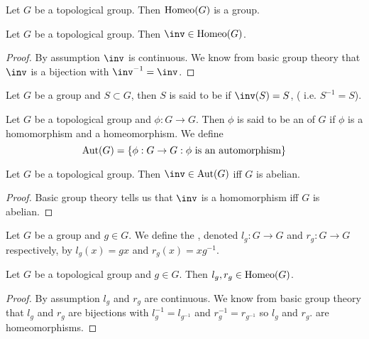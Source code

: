 \documentclass{book}
\begin{document}
	\begin{note}
	Let $G$ be a topological group. Then $\operatorname{Homeo}(G)$ is a group.
	\end{note}
	
	\begin{ex}  
		Let $G$ be a topological group. Then $\inv \in \Homeo(G)$.
	\end{ex}

	\begin{proof}
		By assumption $\inv$ is continuous. We know from basic group theory that $\inv$ is a bijection with $\inv^{-1} = \inv$. 
	\end{proof}

	\begin{defn}  
		Let $G$ be a group and $S \subset G$, then $S$ is said to be  if $\inv(S) = S$, ( i.e. $S^{-1} = S$).
	\end{defn}
	
	\begin{defn}  
		Let $G$ be a topological group and $\phi:G \rightarrow G$. Then $\phi$ is said to be an  of $G$ if $\phi$ is a homomorphism and a homeomorphism. We define $$\operatorname{Aut}(G) = \{\phi:G \rightarrow G: \phi \text{ is an automorphism}\}$$
	\end{defn}
	
	\begin{ex}  
	Let $G$ be a topological group. Then $\inv \in \Aut(G)$ iff $G$ is abelian. 
	\end{ex}
	
	\begin{proof}
	Basic group theory tells us that $\inv$ is a homomorphism iff $G$ is abelian.
	\end{proof}
	
	\begin{defn}  
		Let $G$ be a group and $g \in G$. We define the , denoted $l_g:G \rightarrow G$ and $r_g:G \rightarrow G$ respectively, by $l_g(x) = gx$ and $r_g(x) = xg^{-1}$. 
	\end{defn}
	
	\begin{ex}  
		Let $G$ be a topological group and $g \in G$. Then $l_g, r_g \in \operatorname{Homeo}(G)$.
	\end{ex}
	
	\begin{proof}
		By assumption $l_g$ and $r_g$ are continuous. We know from basic group theory that $l_g$ and $r_g$ are bijections with $l_g^{-1} = l_{g^{-1}}$ and $r_g^{-1} = r_{g^{-1}}$ so $l_g$ and $r_g$. are homeomorphisms. 
	\end{proof}
	
\end{document}
